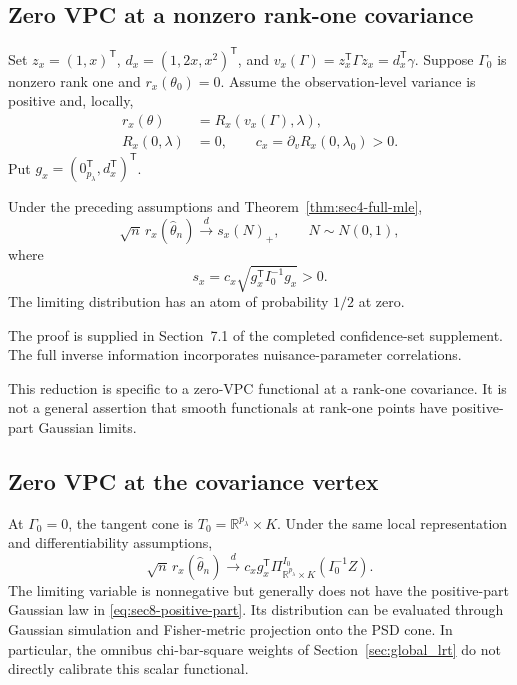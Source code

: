 \subsection{Zero VPC at a nonzero rank-one covariance}
\label{subsec:ci-zero-rankone}

Set $z_x=(1,x)^{\mathsf T}$,
$d_x=(1,2x,x^2)^{\mathsf T}$, and
$v_x(\Gamma)=z_x^{\mathsf T}\Gamma z_x=d_x^{\mathsf T}\gamma$.
Suppose $\Gamma_0$ is nonzero rank one and $r_x(\theta_0)=0$.
Assume the observation-level variance is positive and, locally,
\begin{equation*}
\begin{aligned}
r_x(\theta)&=R_x(v_x(\Gamma),\lambda),\\
R_x(0,\lambda)&=0,\qquad
c_x=\partial_vR_x(0,\lambda_0)>0.
\end{aligned}
\end{equation*}
Put $g_x=(0_{p_\lambda}^{\mathsf T},d_x^{\mathsf T})^{\mathsf T}$.

\begin{proposition}
\label{prop:sec8-positive-part}
Under the preceding assumptions and Theorem~\ref{thm:sec4-full-mle},
\begin{equation}\label{eq:sec8-positive-part}
\sqrt n\,r_x(\widehat\theta_n)
\xrightarrow{d}s_x(N)_+,
\qquad N\sim N(0,1),
\end{equation}
where
\begin{equation}\label{eq:sec8-positive-scale}
s_x=c_x\sqrt{g_x^{\mathsf T}I_0^{-1}g_x}>0.
\end{equation}
The limiting distribution has an atom of probability $1/2$ at zero.
\end{proposition}

The proof is supplied in Section~7.1 of the completed confidence-set supplement. The full
inverse information incorporates nuisance-parameter correlations.


This reduction is specific to a zero-VPC functional at a rank-one
covariance. It is not a general assertion that smooth functionals at
rank-one points have positive-part Gaussian limits.

\subsection{Zero VPC at the covariance vertex}
\label{subsec:ci-zero-vertex}

At $\Gamma_0=0$, the tangent cone is
$T_0=\mathbb R^{p_\lambda}\times K$.
Under the same local representation and differentiability assumptions,
\begin{equation}\label{eq:sec8-vertex}
\sqrt n\,r_x(\widehat\theta_n)
\xrightarrow{d}
c_xg_x^{\mathsf T}
\Pi_{\mathbb R^{p_\lambda}\times K}^{I_0}(I_0^{-1}Z).
\end{equation}
The limiting variable is nonnegative but generally does not have the
positive-part Gaussian law in \eqref{eq:sec8-positive-part}.
Its distribution can be evaluated through Gaussian simulation and
Fisher-metric projection onto the PSD cone. In particular, the omnibus
chi-bar-square weights of Section~\ref{sec:global_lrt} do not directly
calibrate this scalar functional.

